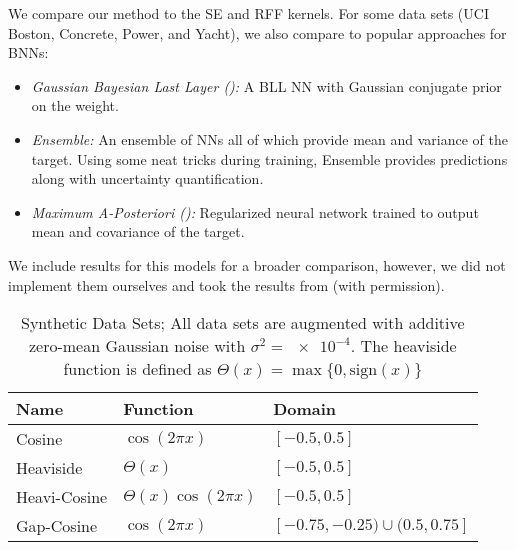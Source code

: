 	We compare our method to the \ac{SE} and \ac{RFF} kernels.
	For some data sets (\ac{UCI} Boston, Concrete, Power, and Yacht), we also compare to popular approaches for \acp{BNN}:
	\begin{itemize}
		\item \emph{Gaussian Bayesian Last Layer ()\cite{rasmussenGaussianProcessesMachine2006}:}
			A \ac{BLL} \ac{NN} with Gaussian conjugate prior on the weight.
		\item \emph{Ensemble\cite{lakshminarayananSimpleScalablePredictive2017}:}
			An ensemble of \acp{NN} all of which provide mean and variance of the target.
			Using some neat tricks during training, Ensemble provides predictions along with uncertainty quantification.
		\item \emph{Maximum A-Posteriori ():}
			Regularized neural network trained to output mean and covariance of the target.
	\end{itemize}
	We include results for this models for a broader comparison, however, we did not implement them ourselves and took the results from\cite{watsonLatentDerivativeBayesian2021} (with permission).

	\begin{table}
		\centering
		\begin{tabular}{lll}
			\toprule
			\textbf{Name}         & \textbf{Function}         & \textbf{Domain}                   \\ \midrule
			Cosine                & $\cos(2 \pi x)$           & $[-0.5, 0.5]$                     \\
			Heaviside\superdagger & $\Theta(x)$               & $[-0.5, 0.5]$                     \\
			Heavi-Cosine          & $\Theta(x) \cos(2 \pi x)$ & $[-0.5, 0.5]$                     \\
			Gap-Cosine            & $\cos(2 \pi x)$           & $[-0.75, -0.25) \cup (0.5, 0.75]$ \\ \bottomrule
		\end{tabular}
		\caption{
			Synthetic Data Sets;
			All data sets are augmented with additive zero-mean Gaussian noise with $\sigma^2 = \num{e-4}$.
			\superdagger{}The heaviside function is defined as $ \Theta(x) = \max\{ 0, \mathrm{sign}(x) \} $
		}
		\label{tab:dataSynthetic}
	\end{table}

